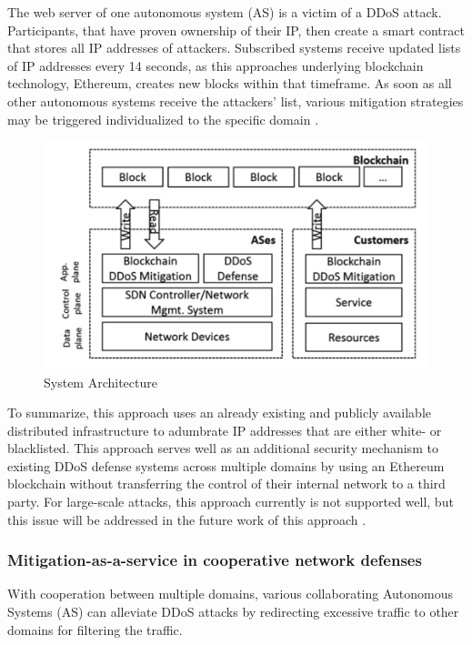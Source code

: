 The web server of one autonomous system (AS) is a victim of a DDoS attack. Participants, that have proven ownership of their IP,  then create a smart contract that stores all IP addresses of attackers. Subscribed systems receive updated lists of IP addresses every 14 seconds, as this approaches underlying blockchain technology, Ethereum, creates new blocks within that timeframe. As soon as all other autonomous systems receive the attackers' list, various mitigation strategies may be triggered individualized to the specific domain \cite{Rodrigues2017}.
\begin{figure}[ht]
  \begin{center}
  \includegraphics[scale=0.6]{Talk7/img/ddos/collaborative_ddos_mitigation_system_architecture}
  \end{center}
  \caption{System Architecture}
  \label{system_architecture}
\end{figure}

To summarize, this approach uses an already existing and publicly available distributed infrastructure to adumbrate IP addresses that are either white- or blacklisted. This approach serves well as an additional security mechanism to existing DDoS defense systems across multiple domains by using an Ethereum blockchain without transferring the control of their internal network to a third party. For large-scale attacks, this approach currently is not supported well, but this issue will be addressed in the future work of this approach \cite{Rodrigues2017}.


\subsubsection{Mitigation-as-a-service in cooperative network defenses}
With cooperation between multiple domains, various collaborating Autonomous Systems (AS) can alleviate DDoS attacks by redirecting excessive traffic to other domains for filtering the traffic.

